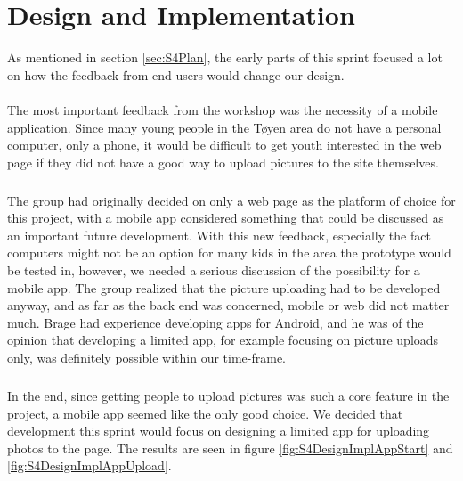 \section{Design and Implementation}
\label{sec:S4DesignImpl}

As mentioned in section \ref{sec:S4Plan}, the early parts of this sprint focused a lot on how the feedback from end users would change our design.

\paragraph{} The most important feedback from the workshop was the necessity of a mobile application. Since many young people in the T\o yen area do not have a personal computer, only a phone, it would be difficult to get youth interested in the web page if they did not have a good way to upload pictures to the site themselves.
\subparagraph{} The group had originally decided on only a web page as the platform of choice for this project, with a mobile app considered something that could be discussed as an important future development. With this new feedback, especially the fact computers might not be an option for many kids in the area the prototype would be tested in, however, we needed a serious discussion of the possibility for a mobile app. The group realized that the picture uploading had to be developed anyway, and as far as the back end was concerned, mobile or web did not matter much. Brage had experience developing apps for Android, and he was of the opinion that developing a limited app, for example focusing on picture uploads only, was definitely possible within our time-frame.
\subparagraph{} In the end, since getting people to upload pictures was such a core feature in the project, a mobile app seemed like the only good choice. We decided that development this sprint would focus on designing a limited app for uploading photos to the page. The results are seen in figure \ref{fig:S4DesignImplAppStart} and \ref{fig:S4DesignImplAppUpload}.

